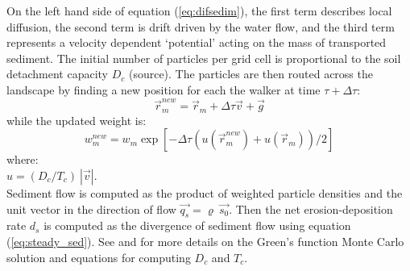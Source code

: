 \documentclass[gmd, manuscript]{copernicus}
\begin{document}
On the left hand side of equation (\ref{eq:difsedim}), 
the first term describes local diffusion, 
the second term is drift driven by the water flow,
and the third term represents a velocity dependent `potential'
acting on the mass of transported sediment. 
The initial number of particles per grid cell 
is proportional to the soil detachment capacity $D_c$ (source).
The particles are then routed across the landscape
by finding a new position for each the walker at time $\tau + \Delta \tau$:
\begin{equation}
\vec{r}_m^{new}=\vec{r}_m + \Delta \tau \vec{v} + \vec{g}
\end{equation}
while the updated weight is:
\begin{equation}
w_m^{new}=w_m \exp[- \Delta \tau(u(\vec{r}_m^{new})+u(\vec{r}_m))/2]
\end{equation}
{\small
\noindent
where:\\
\noindent
\hspace*{0.5em} $u = (D_c / T_c)~|\vec{v}|$.\\
}
%
\noindent
Sediment flow is computed 
as the product of weighted particle densities 
and the unit vector in the direction of flow
$\vec{q_s} = \varrho~\vec{s_0}$.  %
Then the net erosion-deposition rate $d_s$ 
is computed as the divergence of sediment flow using equation (\ref{eq:steady_sed}).
See \citet{Mitas1998} and \citet{Mitasova2004} for more details on the Green's function
Monte Carlo solution and equations for computing $D_c$ and $T_c$.
\end{document}
